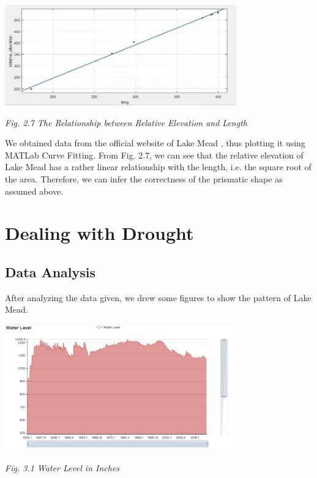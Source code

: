 \documentclass[12pt]{article}
\theoremstyle{definition}
\theoremstyle{remark}
\numberwithin{equation}{section}
\begin{document}
	\begin{center}
		\includegraphics[width=10cm]{2.7 The Relationship between Relative Elevation and Length.jpg}

		\small \textit{Fig. 2.7 The Relationship between Relative Elevation and Length}
	\end{center}

	We obtained data from the official website of Lake Mead \cite{Storage Data}, thus plotting it using MATLab Curve Fitting. From Fig. 2.7, we can see that the relative elevation of Lake Mead has a rather linear relationship with the length, i.e. the square root of the area. Therefore, we can infer the correctness of the prismatic shape as assumed above.

\newpage
\section{Dealing with Drought}

	\subsection{Data Analysis}
		After analyzing the data given, we drew some figures to show the pattern of Lake Mead.
		
		\begin{center}
		\includegraphics[width=10cm]{3.1 Water Level in Inches.jpg}

		\small \textit{Fig. 3.1 Water Level in Inches}
		\end{center}
		
\end{document}
